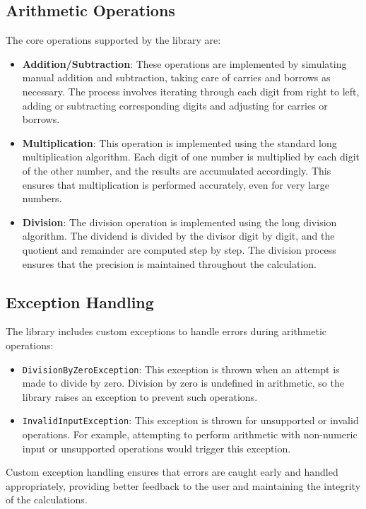 \documentclass[12pt]{article}
\begin{document}
\subsection{Arithmetic Operations}
The core operations supported by the library are:
\begin{itemize}
    \item \textbf{Addition/Subtraction}: These operations are implemented by simulating manual addition and subtraction, taking care of carries and borrows as necessary. The process involves iterating through each digit from right to left, adding or subtracting corresponding digits and adjusting for carries or borrows.
    \item \textbf{Multiplication}: This operation is implemented using the standard long multiplication algorithm. Each digit of one number is multiplied by each digit of the other number, and the results are accumulated accordingly. This ensures that multiplication is performed accurately, even for very large numbers.
    \item \textbf{Division}: The division operation is implemented using the long division algorithm. The dividend is divided by the divisor digit by digit, and the quotient and remainder are computed step by step. The division process ensures that the precision is maintained throughout the calculation.
\end{itemize}

\subsection{Exception Handling}
The library includes custom exceptions to handle errors during arithmetic operations:
\begin{itemize}
    \item \texttt{DivisionByZeroException}: This exception is thrown when an attempt is made to divide by zero. Division by zero is undefined in arithmetic, so the library raises an exception to prevent such operations.
    \item \texttt{InvalidInputException}: This exception is thrown for unsupported or invalid operations. For example, attempting to perform arithmetic with non-numeric input or unsupported operations would trigger this exception.
\end{itemize}

Custom exception handling ensures that errors are caught early and handled appropriately, providing better feedback to the user and maintaining the integrity of the calculations.
\end{document}
